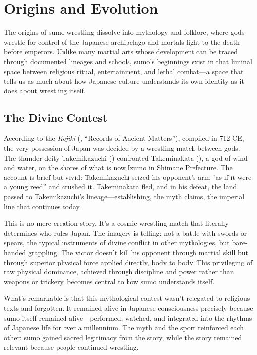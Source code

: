 \section{Origins and Evolution}

The origins of sumo wrestling dissolve into mythology and folklore, where gods wrestle for control of the Japanese archipelago and mortals fight to the death before emperors. Unlike many martial arts whose development can be traced through documented lineages and schools, sumo's beginnings exist in that liminal space between religious ritual, entertainment, and lethal combat—a space that tells us as much about how Japanese culture understands its own identity as it does about wrestling itself.

\subsection{The Divine Contest}

According to the \textit{Kojiki} (, ``Records of Ancient Matters''), compiled in 712 CE, the very possession of Japan was decided by a wrestling match between gods. The thunder deity Takemikazuchi () confronted Takeminakata (), a god of wind and water, on the shores of what is now Izumo in Shimane Prefecture. The account is brief but vivid: Takemikazuchi seized his opponent's arm ``as if it were a young reed'' and crushed it. Takeminakata fled, and in his defeat, the land passed to Takemikazuchi's lineage—establishing, the myth claims, the imperial line that continues today.

This is no mere creation story. It's a cosmic wrestling match that literally determines who rules Japan. The imagery is telling: not a battle with swords or spears, the typical instruments of divine conflict in other mythologies, but bare-handed grappling. The victor doesn't kill his opponent through martial skill but through superior physical force applied directly, body to body. This privileging of raw physical dominance, achieved through discipline and power rather than weapons or trickery, becomes central to how sumo understands itself.

What's remarkable is that this mythological contest wasn't relegated to religious texts and forgotten. It remained alive in Japanese consciousness precisely because sumo itself remained alive—performed, watched, and integrated into the rhythms of Japanese life for over a millennium. The myth and the sport reinforced each other: sumo gained sacred legitimacy from the story, while the story remained relevant because people continued wrestling.


